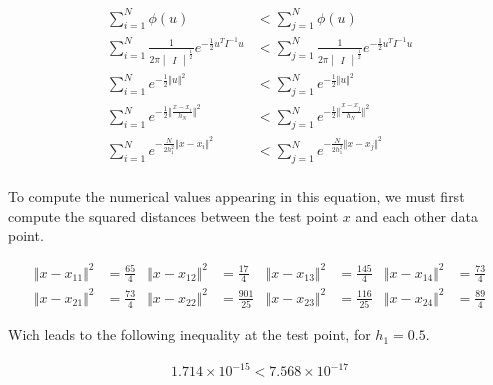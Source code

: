 \documentclass[a4paper, 10pt, twoside]{article}
\begin{document}
\begin{enumerate}[a)]
          \begin{align*}
              \sum_{i=1}^N \phi(u)                                                                              & < \sum_{j=1}^N \phi(u)                                                                              \\
              \sum_{i=1}^N \frac{1}{2 \pi \begin{vmatrix}I\end{vmatrix}^\frac{1}{2}} e^{-\frac{1}{2} u^T I^{-1} u} & < \sum_{j=1}^N \frac{1}{2 \pi \begin{vmatrix}I\end{vmatrix}^\frac{1}{2}} e^{-\frac{1}{2} u^T I^{-1} u} \\
              \sum_{i=1}^N e^{-\frac{1}{2} \Vert u \Vert^2}                                                     & < \sum_{j=1}^N e^{-\frac{1}{2} \Vert u \Vert^2}                                                     \\
              \sum_{i=1}^N e^{-\frac{1}{2} \Vert \frac{x - x_i}{h_N} \Vert^2}                                   & < \sum_{j=1}^N e^{-\frac{1}{2} \Vert  \frac{x - x_j}{h_N} \Vert^2}                                  \\
              \sum_{i=1}^N e^{-\frac{N}{2h_1^2} \Vert x - x_i \Vert^2}                                          & < \sum_{j=1}^N e^{-\frac{N}{2h_1^2} \Vert x - x_j \Vert^2}                                          \\
          \end{align*}

          To compute the numerical values appearing in this equation, we must first compute the squared distances between the test point $x$ and each other data point.

          \begin{align*}
              \Vert x - x_{11} \Vert^2 & = \frac{65}{4} & \Vert x - x_{12} \Vert^2 & = \frac{17}{4}   & \Vert x - x_{13} \Vert^2 & = \frac{145}{4}  & \Vert x - x_{14} \Vert^2 & = \frac{73}{4} \\
              \Vert x - x_{21} \Vert^2 & = \frac{73}{4} & \Vert x - x_{22} \Vert^2 & = \frac{901}{25} & \Vert x - x_{23} \Vert^2 & = \frac{116}{25} & \Vert x - x_{24} \Vert^2 & = \frac{89}{4}
          \end{align*}

          Wich leads to the following inequality at the test point, for $h_1 = 0.5$.

          \begin{align*}
              1.714 \times 10^{-15} < 7.568 \times 10^{-17}
          \end{align*}


\end{enumerate}
\end{document}

